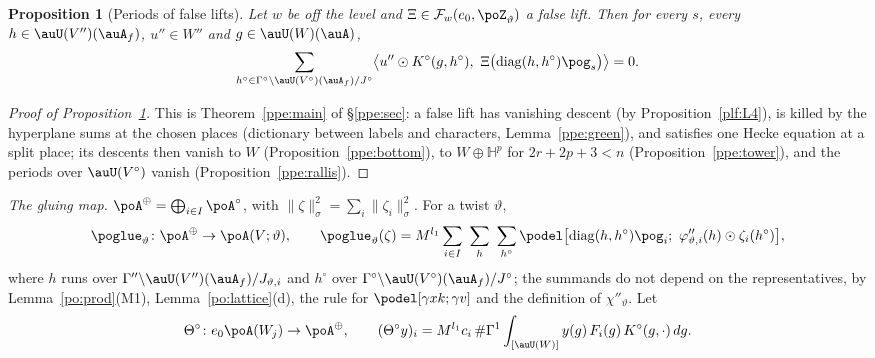 \documentclass[10pt]{amsart}
\newtheorem{proposition}[theorem]{Proposition}
\theoremstyle{definition}
\theoremstyle{remark}
\begin{document}
\begin{proposition}[Periods of false lifts]\label{po:periods}
Let $w$ be off the level and $\Xi\in\mathcal F_w(e_0,\poZ_\vartheta)$ a false lift. Then for every
$s$, every $h\in\auU(V'')(\auA_f)$, $u''\in W''$ and $g\in\auU(W)(\auA)$,
\[
\sum_{h^\circ\in\Gamma^\circ\backslash\auU(V^\circ)(\auA_f)/J^\circ}\bigl\langle u''\odot K^\circ(g,
h^\circ),\ \Xi\bigl(\operatorname{diag}(h,h^\circ)\pog_s\bigr)\bigr\rangle=0 .
\]
\end{proposition}
\begin{proof}[Proof of Proposition~\ref{po:periods}]
This is Theorem~\ref{ppe:main} of \S\ref{ppe:sec}: a false lift has vanishing descent (by
Proposition~\ref{plf:L4}), is killed by the hyperplane sums at the chosen places (dictionary between
labels and characters, Lemma~\ref{ppe:green}), and satisfies one Hecke equation at a split place;
its descents then vanish to $W$ (Proposition~\ref{ppe:bottom}), to $W\oplus\mathbb H^p$ for
$2r+2p+3<n$ (Proposition~\ref{ppe:tower}), and the periods over $\auU(V^\circ)$ vanish
(Proposition~\ref{ppe:rallis}).
\end{proof}


\emph{The gluing map.} $\poA^\oplus=\bigoplus_{i\in I}\poA^\circ$, with $\|\zeta\|_\sigma^2=\sum_i
\|\zeta_i\|_\sigma^2$. For a twist $\vartheta$,
\[
\poglue_\vartheta\colon\poA^\oplus\to\poA(V;\vartheta),\qquad
\poglue_\vartheta(\zeta)=M^{l_1}\sum_{i\in I}\ \sum_{h}\ \sum_{h^\circ}\podel\bigl[\operatorname{diag}
(h,h^\circ)\pog_i;\ \varphi''_{\vartheta,i}(h)\odot\zeta_i(h^\circ)\bigr],
\]
where $h$ runs over $\Gamma''\backslash\auU(V'')(\auA_f)/J_{\vartheta,i}$ and $h^\circ$ over
$\Gamma^\circ\backslash\auU(V^\circ)(\auA_f)/J^\circ$; the summands do not depend on the
representatives, by Lemma~\ref{po:prod}(M1), Lemma~\ref{po:lattice}(d), the rule for
$\podel[\gamma xk;\gamma v]$ and the definition of $\chi''_\vartheta$. Let
\[
\Theta^\circ\colon e_0\poA(W_j)\to\poA^\oplus,\qquad(\Theta^\circ y)_i=M^{l_1}c_i\,\#\Gamma^1
\int_{[\auU(W)]}y(g)\,F_i(g)\,K^\circ(g,\cdot)\,dg .
\]
\end{document}
